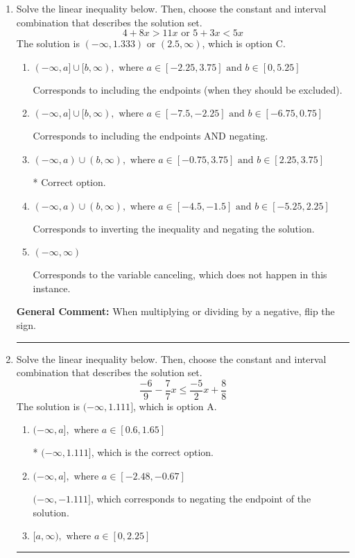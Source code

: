 \documentclass{extbook}[14pt]
\newcommand{\litem}[1]{\item #1

\rule{\textwidth}{0.4pt}}
\begin{document}
\begin{enumerate}\litem{
Solve the linear inequality below. Then, choose the constant and interval combination that describes the solution set.
\[ 4 + 8 x > 11 x \text{ or } 5 + 3 x < 5 x \]The solution is \( (-\infty, 1.333) \text{ or } (2.5, \infty) \), which is option C.\begin{enumerate}[label=\Alph*.]
\item \( (-\infty, a] \cup [b, \infty), \text{ where } a \in [-2.25, 3.75] \text{ and } b \in [0, 5.25] \)

Corresponds to including the endpoints (when they should be excluded).
\item \( (-\infty, a] \cup [b, \infty), \text{ where } a \in [-7.5, -2.25] \text{ and } b \in [-6.75, 0.75] \)

Corresponds to including the endpoints AND negating.
\item \( (-\infty, a) \cup (b, \infty), \text{ where } a \in [-0.75, 3.75] \text{ and } b \in [2.25, 3.75] \)

 * Correct option.
\item \( (-\infty, a) \cup (b, \infty), \text{ where } a \in [-4.5, -1.5] \text{ and } b \in [-5.25, 2.25] \)

Corresponds to inverting the inequality and negating the solution.
\item \( (-\infty, \infty) \)

Corresponds to the variable canceling, which does not happen in this instance.
\end{enumerate}

\textbf{General Comment:} When multiplying or dividing by a negative, flip the sign.
}
\litem{
Solve the linear inequality below. Then, choose the constant and interval combination that describes the solution set.
\[ \frac{-6}{9} - \frac{7}{7} x \leq \frac{-5}{2} x + \frac{8}{8} \]The solution is \( (-\infty, 1.111] \), which is option A.\begin{enumerate}[label=\Alph*.]
\item \( (-\infty, a], \text{ where } a \in [0.6, 1.65] \)

* $(-\infty, 1.111]$, which is the correct option.
\item \( (-\infty, a], \text{ where } a \in [-2.48, -0.67] \)

 $(-\infty, -1.111]$, which corresponds to negating the endpoint of the solution.
\item \( [a, \infty), \text{ where } a \in [0, 2.25] \)


\end{enumerate}}
\end{enumerate}
\end{document}
